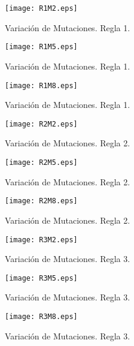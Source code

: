 \documentclass{article}
\begin{document}
\begin{figure}[htb] %
    \centering
    \texttt{[image: R1M2.eps]} %
    \caption{Variaci\'on de Mutaciones. Regla 1.}
    \label{Figura 10}
\end{figure}
\begin{figure}[htb] %
    \centering
    \texttt{[image: R1M5.eps]} %
    \caption{Variaci\'on de Mutaciones. Regla 1.}
    \label{Figura 11}
\end{figure}
\begin{figure}[htb] %
    \centering
    \texttt{[image: R1M8.eps]} %
    \caption{Variaci\'on de Mutaciones. Regla 1.}
    \label{Figura 12}
\end{figure}
\begin{figure}[htb] %
    \centering
    \texttt{[image: R2M2.eps]} %
    \caption{Variaci\'on de Mutaciones. Regla 2.}
    \label{Figura 13}
\end{figure}
\begin{figure}[htb] %
    \centering
    \texttt{[image: R2M5.eps]} %
    \caption{Variaci\'on de Mutaciones. Regla 2.}
    \label{Figura 14}
\end{figure}
\begin{figure}[htb] %
    \centering
    \texttt{[image: R2M8.eps]} %
    \caption{Variaci\'on de Mutaciones. Regla 2.}
    \label{Figura 15}
\end{figure}
\begin{figure}[htb] %
    \centering
    \texttt{[image: R3M2.eps]} %
    \caption{Variaci\'on de Mutaciones. Regla 3.}
    \label{Figura 16}
\end{figure}
\begin{figure}[htb] %
    \centering
    \texttt{[image: R3M5.eps]} %
    \caption{Variaci\'on de Mutaciones. Regla 3.}
    \label{Figura 17}
\end{figure}
\begin{figure}[htb] %
    \centering
    \texttt{[image: R3M8.eps]} %
    \caption{Variaci\'on de Mutaciones. Regla 3.}
    \label{Figura 18}
\end{figure}
\end{document}

